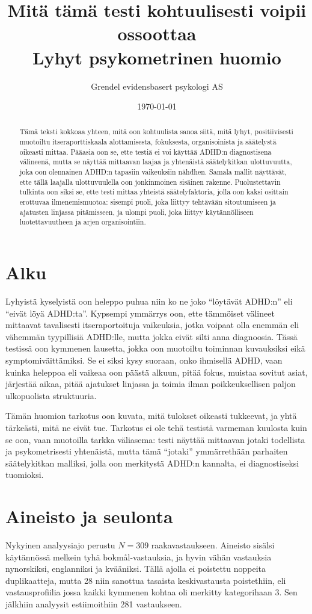 \documentclass[11pt,a4paper]{article}
\title{Mitä tämä testi kohtuulisesti voipii ossoottaa\\
\large Lyhyt psykometrinen huomio}
\author{Grendel evidensbasert psykologi AS}
\date{\today}
\begin{document}
\maketitle

\begin{abstract}
Tämä teksti kokkoaa yhteen, mitä oon kohtuulista sanoa siitä, mitä lyhyt, positiivisesti muotoiltu itseraporttiskaala alottamisesta, fokuksesta, organisoinista ja säätelystä oikeasti mittaa. Pääasia oon se, ette testiä ei voi käyttää ADHD:n diagnostisena välineenä, mutta se näyttää mittaavan laajaa ja yhtenäistä säätelykitkan ulottuvuutta, joka oon olennainen ADHD:n tapasiin vaikeuksiin nähđhen. Samala mallit näyttävät, ette tällä laajalla ulottuvuulella oon jonkinmoinen sisäinen rakenne. Puolustettavin tulkinta oon siksi se, ette testi mittaa yhteistä säätelyfaktoria, jolla oon kaksi osittain erottuvaa ilmenemismuotoa: sisempi puoli, joka liittyy tehtävään sitoutumiseen ja ajatusten linjassa pitämisseen, ja ulompi puoli, joka liittyy käytännölliseen luotettavuutheen ja arjen organisointiin.
\end{abstract}

\section{Alku}
Lyhyistä kyselyistä oon heleppo puhua niin ko ne joko ``löytävät ADHD:n'' eli ``eivät löyä ADHD:ta''. Kypsempi ymmärrys oon, ette tämmöiset välineet mittaavat tavalisesti itseraportoituja vaikeuksia, jotka voipaat olla enemmän eli vähemmän tyypillisiä ADHD:lle, mutta jokka eivät silti anna diagnoosia. Tässä testissä oon kymmenen lausetta, jokka oon muotoiltu toiminnan kuvauksiksi eikä symptomiväittämiksi. Se ei siksi kysy suoraan, onko ihmisellä ADHD, vaan kuinka heleppoa eli vaikeaa oon päästä alkuun, pitää fokus, muistaa sovitut asiat, järjestää aikaa, pitää ajatukset linjassa ja toimia ilman poikkeuksellisen paljon ulkopuolista struktuuria.

Tämän huomion tarkotus oon kuvata, mitä tulokset oikeasti tukkeevat, ja yhtä tärkeästi, mitä ne eivät tue. Tarkotus ei ole tehä testistä varmeman kuulosta kuin se oon, vaan muotoilla tarkka väliasema: testi näyttää mittaavan jotaki todellista ja psykometrisesti yhtenäistä, mutta tämä ``jotaki'' ymmärrethään parhaiten säätelykitkan malliksi, jolla oon merkitystä ADHD:n kannalta, ei diagnostiseksi tuomioksi.

\section{Aineisto ja seulonta}
Nykyinen analyysiajo perustu $N = 309$ raakavastaukseen. Aineisto sisälsi käytännössä melkein tyhä bokmål-vastauksia, ja hyvin vähän vastauksia nynorskiksi, englanniksi ja kvääniksi. Tällä ajolla ei poistettu noppeita duplikaatteja, mutta 28 niin sanottua tasaista keskivastausta poistethiin, eli vastausprofiilia jossa kaikki kymmenen kohtaa oli merkitty kategorihaan 3. Sen jälkhiin analyysit estiimoithiin 281 vastaukseen.
\end{document}
